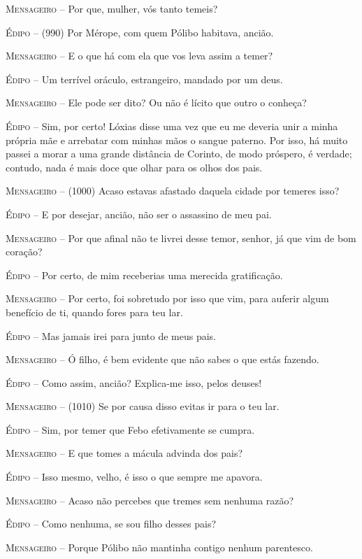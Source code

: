 \textsc{Mensageiro} --   Por que, mulher, vós tanto temeis?

\textsc{Édipo} --   (990) Por Mérope, com quem Pólibo habitava, ancião.

\textsc{Mensageiro} --   E o que há com ela que vos leva assim a temer?

\textsc{Édipo} --   Um terrível oráculo, estrangeiro, mandado por um deus.

\textsc{Mensageiro} --   Ele pode ser dito? Ou não é lícito que outro o conheça?

\textsc{Édipo} --   Sim, por certo! Lóxias disse uma vez que eu me deveria unir a minha
própria mãe e arrebatar com minhas mãos o sangue paterno. Por isso, há
muito passei a morar a uma grande distância de Corinto, de modo
próspero, é verdade; contudo, nada é mais doce que olhar para os olhos
dos pais.

\textsc{Mensageiro} --   (1000) Acaso estavas afastado daquela cidade por temeres isso?

\textsc{Édipo} --   E por desejar, ancião, não ser o assassino de meu pai.

\textsc{Mensageiro} --   Por que afinal não te livrei desse temor, senhor, já que vim de bom
coração?

\textsc{Édipo} --   Por certo, de mim receberias uma merecida gratificação.

\textsc{Mensageiro} --   Por certo, foi sobretudo por isso que vim, para auferir algum benefício
de ti, quando fores para teu lar.

\textsc{Édipo} --   Mas jamais irei para junto de meus pais.

\textsc{Mensageiro} --   Ó filho, é bem evidente que não sabes o que estás fazendo.

\textsc{Édipo} --   Como assim, ancião? Explica-me isso, pelos deuses!

\textsc{Mensageiro} --   (1010) Se por causa disso evitas ir para o teu lar.

\textsc{Édipo} --   Sim, por temer que Febo efetivamente se cumpra.

\textsc{Mensageiro} --   E que tomes a mácula advinda dos pais?

\textsc{Édipo} --   Isso mesmo, velho, é isso o que sempre me apavora.

\textsc{Mensageiro} --   Acaso não percebes que tremes sem nenhuma razão?

\textsc{Édipo} --   Como nenhuma, se sou filho desses pais?

\textsc{Mensageiro} --   Porque Pólibo não mantinha contigo nenhum parentesco.

